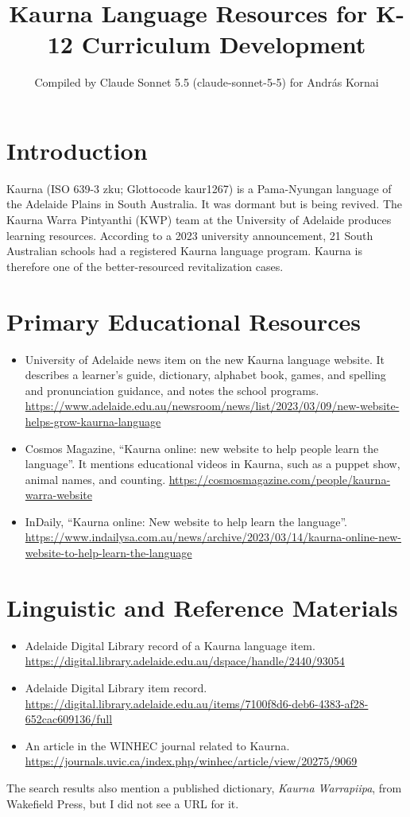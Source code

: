 \documentclass[12pt]{article}
\title{Kaurna Language Resources for K-12 Curriculum Development}
\author{Compiled by Claude Sonnet 5.5 (claude-sonnet-5-5) for Andr\'as Kornai}
\date{}
\begin{document}
\maketitle

\section{Introduction}
Kaurna (ISO 639-3 zku; Glottocode kaur1267) is a Pama-Nyungan language of the Adelaide Plains in South Australia. It was dormant but is being revived. The Kaurna Warra Pintyanthi (KWP) team at the University of Adelaide produces learning resources. According to a 2023 university announcement, 21 South Australian schools had a registered Kaurna language program. Kaurna is therefore one of the better-resourced revitalization cases.

\section{Primary Educational Resources}
\begin{itemize}
\item University of Adelaide news item on the new Kaurna language website. It describes a learner's guide, dictionary, alphabet book, games, and spelling and pronunciation guidance, and notes the school programs. \url{https://www.adelaide.edu.au/newsroom/news/list/2023/03/09/new-website-helps-grow-kaurna-language}
\item Cosmos Magazine, ``Kaurna online: new website to help people learn the language''. It mentions educational videos in Kaurna, such as a puppet show, animal names, and counting. \url{https://cosmosmagazine.com/people/kaurna-warra-website}
\item InDaily, ``Kaurna online: New website to help learn the language''. \url{https://www.indailysa.com.au/news/archive/2023/03/14/kaurna-online-new-website-to-help-learn-the-language}
\end{itemize}

\section{Linguistic and Reference Materials}
\begin{itemize}
\item Adelaide Digital Library record of a Kaurna language item. \url{https://digital.library.adelaide.edu.au/dspace/handle/2440/93054}
\item Adelaide Digital Library item record. \url{https://digital.library.adelaide.edu.au/items/7100f8d6-deb6-4383-af28-652cac609136/full}
\item An article in the WINHEC journal related to Kaurna. \url{https://journals.uvic.ca/index.php/winhec/article/view/20275/9069}
\end{itemize}
The search results also mention a published dictionary, \emph{Kaurna Warrapiipa}, from Wakefield Press, but I did not see a URL for it.
\end{document}
